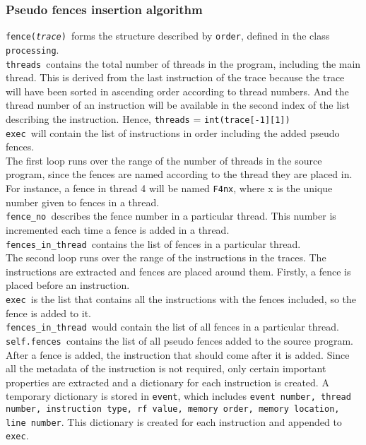 \documentclass{article}
\newcommand{\var}[1]{\color{OliveGreen} \texttt{#1}\color{black}}
\newcommand{\fun}[2]{\color{Sepia}\texttt{#1(\color{Gray}\textit{#2}\color{Sepia})}\color{black}}
\newcommand{\varinfo}[1]{\scriptsize \texttt{#1} \normalsize}
\newcommand{\class}[1]{\color{DarkOrchid}\texttt{#1}\color{black}}
\begin{document}
\subsubsection{Pseudo fences insertion algorithm}
\fun{fence}{trace}\ forms the structure described by \var{order}, defined in the class \class{processing}.\\

\var{threads }contains the total number of threads in the program, including the main thread. This is derived from the last instruction of the trace because the trace will have been sorted in ascending order according to thread numbers. And the thread number of an instruction will be available in the second index of the list describing the instruction. Hence, \var{threads} = \varinfo{int(trace[-1][1])}\\

\var{exec }will contain the list of instructions in order including the added pseudo fences.\\

The first loop runs over the range of the number of threads in the source program, since the fences are named according to the thread they are placed in. For instance, a fence in thread 4 will be named \texttt{F4nx}, where x is the unique number given to fences in a thread. \\

\var{fence\_no }describes the fence number in a particular thread. This number is incremented each time a fence is added in a thread.\\

\var{fences\_in\_thread }contains the list of fences in a particular thread.\\

The second loop runs over the range of the instructions in the traces. The instructions are extracted and fences are placed around them. Firstly, a fence is placed before an instruction.\\
\var{exec }is the list that contains all the instructions with the fences included, so the fence is added to it.\\
\var{fences\_in\_thread }would contain the list of all fences in a particular thread.\\
\var{self.fences }contains the list of all pseudo fences added to the source program.\\

After a fence is added, the instruction that should come after it is added. Since all the metadata of the instruction is not required, only certain important properties are extracted and a dictionary for each instruction is created. A temporary dictionary is stored in \var{event}, which includes \texttt{event number, thread number, instruction type, rf value, memory order, memory location, line number}. This dictionary is created for each instruction and appended to \var{exec}.\\
\end{document}
